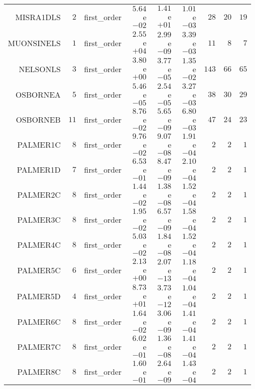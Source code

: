 \begin{longtable}{rrrrrrrrr}
MISRA1DLS & \(     2\) & first\_order & \( 5.64\)e\(-02\) & \( 1.41\)e\(+01\) & \( 1.01\)e\(-03\) & \(    28\) & \(    20\) & \(    19\) \\
MUONSINELS & \(     1\) & first\_order & \( 2.55\)e\(+04\) & \( 2.99\)e\(-09\) & \( 3.39\)e\(-03\) & \(    11\) & \(     8\) & \(     7\) \\
NELSONLS & \(     3\) & first\_order & \( 3.80\)e\(+00\) & \( 3.77\)e\(-05\) & \( 1.35\)e\(-02\) & \(   143\) & \(    66\) & \(    65\) \\
OSBORNEA & \(     5\) & first\_order & \( 5.46\)e\(-05\) & \( 2.54\)e\(-05\) & \( 3.27\)e\(-03\) & \(    38\) & \(    30\) & \(    29\) \\
OSBORNEB & \(    11\) & first\_order & \( 8.76\)e\(-02\) & \( 5.65\)e\(-09\) & \( 6.80\)e\(-03\) & \(    47\) & \(    24\) & \(    23\) \\
PALMER1C & \(     8\) & first\_order & \( 9.76\)e\(-02\) & \( 9.07\)e\(-08\) & \( 1.91\)e\(-04\) & \(     2\) & \(     2\) & \(     1\) \\
PALMER1D & \(     7\) & first\_order & \( 6.53\)e\(-01\) & \( 8.47\)e\(-09\) & \( 2.10\)e\(-04\) & \(     2\) & \(     2\) & \(     1\) \\
PALMER2C & \(     8\) & first\_order & \( 1.44\)e\(-02\) & \( 1.38\)e\(-08\) & \( 1.52\)e\(-04\) & \(     2\) & \(     2\) & \(     1\) \\
PALMER3C & \(     8\) & first\_order & \( 1.95\)e\(-02\) & \( 6.57\)e\(-09\) & \( 1.58\)e\(-04\) & \(     2\) & \(     2\) & \(     1\) \\
PALMER4C & \(     8\) & first\_order & \( 5.03\)e\(-02\) & \( 1.84\)e\(-08\) & \( 1.52\)e\(-04\) & \(     2\) & \(     2\) & \(     1\) \\
PALMER5C & \(     6\) & first\_order & \( 2.13\)e\(+00\) & \( 2.07\)e\(-13\) & \( 1.18\)e\(-04\) & \(     2\) & \(     2\) & \(     1\) \\
PALMER5D & \(     4\) & first\_order & \( 8.73\)e\(+01\) & \( 3.73\)e\(-12\) & \( 1.04\)e\(-04\) & \(     2\) & \(     2\) & \(     1\) \\
PALMER6C & \(     8\) & first\_order & \( 1.64\)e\(-02\) & \( 3.06\)e\(-09\) & \( 1.41\)e\(-04\) & \(     2\) & \(     2\) & \(     1\) \\
PALMER7C & \(     8\) & first\_order & \( 6.02\)e\(-01\) & \( 1.36\)e\(-08\) & \( 1.41\)e\(-04\) & \(     2\) & \(     2\) & \(     1\) \\
PALMER8C & \(     8\) & first\_order & \( 1.60\)e\(-01\) & \( 2.64\)e\(-09\) & \( 1.43\)e\(-04\) & \(     2\) & \(     2\) & \(     1\) \\

\end{longtable}
